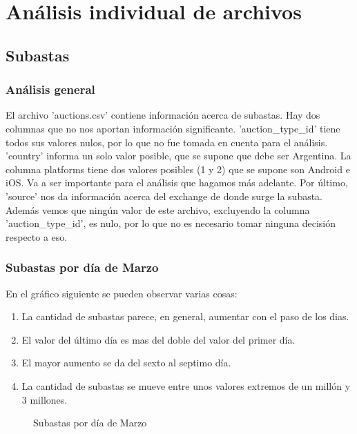 \documentclass{article}
\newcommand\tab[1][1cm]{\hspace*{#1}}
\begin{document}
\section{Análisis individual de archivos}
\subsection{Subastas}
	\subsubsection{Análisis general}
	 \tab El archivo 'auctions.csv' contiene información acerca de subastas.
	Hay dos columnas que no nos aportan información significante. 'auction\_type\_id' tiene todos sus valores 		nulos, por lo que no fue tomada en cuenta para el análisis. 'country' informa un solo valor posible, que se supone que debe ser Argentina.
	\tab La columna platforms tiene dos valores posibles (1 y 2) que se supone son Android e iOS. Va a ser importante para el análisis que hagamos más adelante.
	\tab Por último, 'source' nos da información acerca del exchange de donde surge la subasta.
	\tab Además vemos que ningún valor de este archivo, excluyendo la columna 'auction\_type\_id', es nulo, por lo que no es necesario tomar ninguna decisión respecto a eso.
	
	\subsubsection{Subastas por día de Marzo}
	\tab En el gráfico siguiente se pueden observar varias cosas:
	\begin{enumerate}
		\item La cantidad de subastas parece, en general, aumentar con el paso de los dias.
		\item El valor del último día es mas del doble del valor del primer día.
		\item El mayor aumento se da del sexto al septimo día.
		\item La cantidad de subastas se mueve entre unos valores extremos de un millón y 3 millones.
	\end{enumerate}
			\begin{figure}
		    	\centering
		    	\caption{Subastas por día de Marzo}
			\end{figure}
\end{document}
